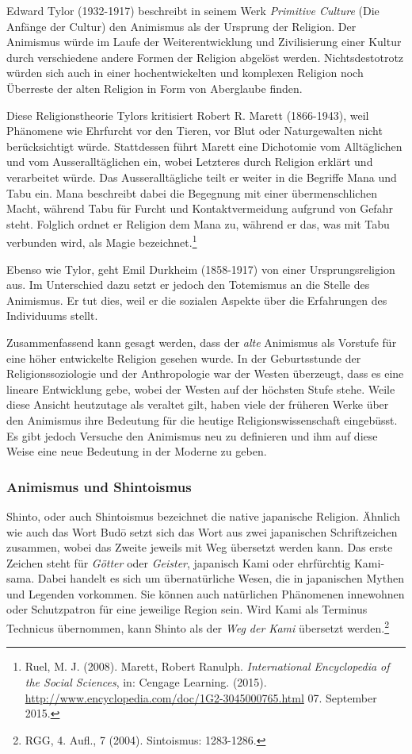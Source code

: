 Edward Tylor (1932-1917) beschreibt in seinem Werk \emph{Primitive Culture} (Die Anfänge der Cultur) den Animismus als der Ursprung der Religion. Der Animismus würde im Laufe der Weiterentwicklung und Zivilisierung einer Kultur durch verschiedene andere Formen der Religion abgelöst werden. Nichtsdestotrotz würden sich auch in einer hochentwickelten und komplexen Religion noch Überreste der alten Religion in Form von Aberglaube finden.

Diese Religionstheorie Tylors kritisiert Robert R. Marett (1866-1943), weil Phänomene wie Ehrfurcht vor den Tieren, vor Blut oder Naturgewalten nicht berücksichtigt würde. Stattdessen führt Marett eine Dichotomie vom Alltäglichen und vom Ausseralltäglichen ein, wobei Letzteres durch Religion erklärt und verarbeitet würde. Das Ausseralltägliche teilt er weiter in die Begriffe Mana und Tabu ein. Mana beschreibt dabei die Begegnung mit einer übermenschlichen Macht, während Tabu für Furcht und Kontaktvermeidung aufgrund von Gefahr steht. Folglich ordnet er Religion dem Mana zu, während er das, was mit Tabu verbunden wird, als Magie bezeichnet.\footnote{Ruel, M. J. (2008). \glqq Marett, Robert Ranulph\grqq. \emph{International Encyclopedia of the Social Sciences}, in: Cengage Learning. (2015). \url{http://www.encyclopedia.com/doc/1G2-3045000765.html} 07. September 2015.} 

Ebenso wie Tylor, geht Emil Durkheim (1858-1917) von einer Ursprungsreligion aus. Im Unterschied dazu setzt er jedoch den Totemismus an die Stelle des Animismus. Er tut dies, weil er die sozialen Aspekte über die Erfahrungen des Individuums stellt.

Zusammenfassend kann gesagt werden, dass der \emph{alte} Animismus als Vorstufe für eine höher entwickelte Religion gesehen wurde. In der Geburtsstunde der Religionssoziologie und der Anthropologie war der Westen überzeugt, dass es eine lineare Entwicklung gebe, wobei der Westen auf der höchsten Stufe stehe. Weile diese Ansicht heutzutage als veraltet gilt, haben viele der früheren Werke über den Animismus ihre Bedeutung für die heutige Religionswissenschaft eingebüsst. Es gibt jedoch Versuche den Animismus neu zu definieren und ihm auf diese Weise eine neue Bedeutung in der Moderne zu geben. 

\subsubsection{Animismus und Shintoismus}
Shinto, oder auch Shintoismus bezeichnet die native japanische Religion. Ähnlich wie auch das Wort Bud\={o} setzt sich das Wort aus zwei japanischen Schriftzeichen zusammen, wobei das Zweite jeweils mit Weg übersetzt werden kann. Das erste Zeichen steht für \emph{Götter} oder \emph{Geister}, japanisch Kami oder ehrfürchtig Kami-sama. Dabei handelt es sich um übernatürliche Wesen, die in japanischen Mythen und Legenden vorkommen. Sie können auch natürlichen Phänomenen innewohnen oder Schutzpatron für eine jeweilige Region sein. Wird Kami als Terminus Technicus übernommen, kann Shinto als der \emph{Weg der Kami} übersetzt werden.\footnote{RGG, 4. Aufl., 7 (2004). Sintoismus: 1283-1286.}

